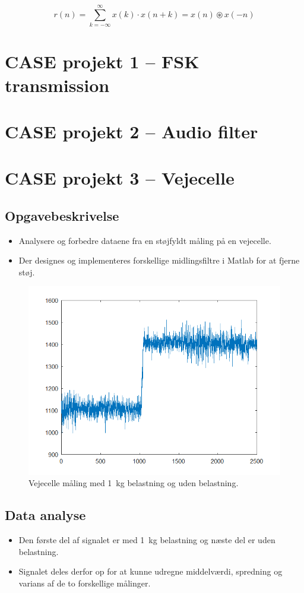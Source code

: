 \documentclass[danish]{article}
\begin{document}
\begin{equation}
r(n) = \sum_{k=-\infty}^{\infty} x(k) \cdot x(n+k) = x(n) \circledast x(-n)
\end{equation}

\newpage
\section{CASE projekt 1 – FSK transmission}
\newpage
\section{CASE projekt 2 – Audio filter}
\newpage
\section{CASE projekt 3 – Vejecelle}
\subsection{Opgavebeskrivelse}
\begin{itemize}
	\item Analysere og forbedre dataene fra en støjfyldt måling på en vejecelle.
	\item Der designes og implementeres forskellige midlingsfiltre i Matlab for at fjerne støj.
\end{itemize}

\begin{figure}[H]
	\centering
	\includegraphics[width=0.3\linewidth]{graphics/case3_1}
	\caption{Vejecelle måling med \SI{1}{\kilogram} belastning og  uden belastning.}
	\label{fig:case3_1}
\end{figure}

\subsection{Data analyse}
\begin{itemize}
	\item Den første del af signalet er med \SI{1}{\kilogram} belastning og næste del er uden belastning. 
	\item  Signalet deles derfor op for at kunne udregne middelværdi, spredning og varians af de to forskellige målinger.
\end{itemize} 
\end{document}

